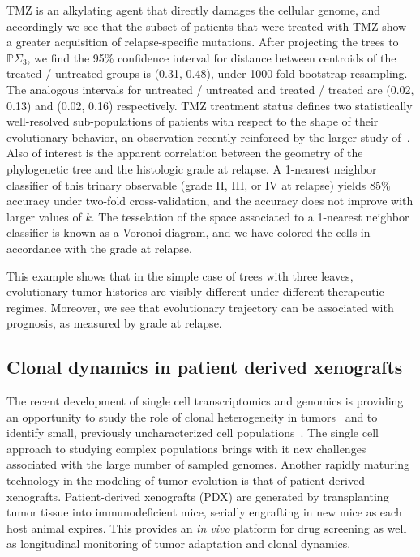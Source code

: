 \documentclass[a4paper,11pt]{article}
\begin{document}
TMZ is an alkylating agent that directly damages the cellular genome, and accordingly we see that the subset of patients that were treated with TMZ show a greater acquisition of relapse-specific mutations.
After projecting the trees to $\mathbb{P}\Sigma_3$, we find the 95\% confidence interval for distance between centroids of the treated / untreated groups is (0.31, 0.48), under 1000-fold bootstrap resampling.
The analogous intervals for untreated / untreated and treated / treated are (0.02, 0.13) and (0.02, 0.16) respectively.
TMZ treatment status defines two statistically well-resolved sub-populations of patients with respect to the shape of their evolutionary behavior, an observation recently reinforced by the larger study of~\cite{wang2016clonal}.
Also of interest is the apparent correlation between the geometry of the phylogenetic tree and the histologic grade at relapse.
A 1-nearest neighbor classifier of this trinary observable (grade II, III, or IV at relapse) yields 85\% accuracy under two-fold cross-validation, and the accuracy does not improve with larger values of $k$.
The tesselation of the space associated to a 1-nearest neighbor classifier is known as a Voronoi diagram, and we have colored the cells in accordance with the grade at relapse.

This example shows that in the simple case of trees with three leaves, evolutionary tumor histories are visibly different under different therapeutic regimes.
Moreover, we see that evolutionary trajectory can be associated with prognosis, as measured by grade at relapse.

\subsection{Clonal dynamics in patient derived xenografts}\label{sec:xeno}

The recent development of single cell transcriptomics and genomics is providing an opportunity to study the role of clonal heterogeneity in tumors~\cite{navin2011tumour, eirew2014dynamics, patel2014single} and to identify small, previously uncharacterized cell populations~\cite{grun2015single}.
The single cell approach to studying complex populations brings with it new challenges associated with the large number of sampled genomes.
Another rapidly maturing technology in the modeling of tumor evolution is that of patient-derived xenografts.
Patient-derived xenografts (PDX) are generated by transplanting tumor tissue into immunodeficient mice, serially engrafting in new mice as each host animal expires.
This provides an \textit{in vivo} platform for drug screening as well as longitudinal monitoring of tumor adaptation and clonal dynamics.
\end{document}
